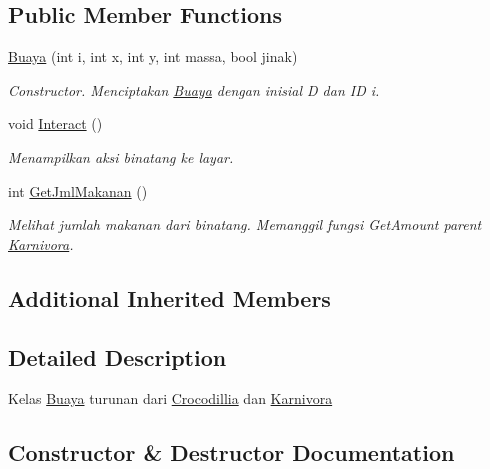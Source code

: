 \subsection*{Public Member Functions}
\begin{DoxyCompactItemize}
\item 
\hyperlink{classBuaya_a56229331076a5f3cb5bf26a354b246d2}{Buaya} (int i, int x, int y, int massa, bool jinak)
\begin{DoxyCompactList}\small\item\em Constructor. Menciptakan \hyperlink{classBuaya}{Buaya} dengan inisial \textquotesingle{}D\textquotesingle{} dan ID i. \end{DoxyCompactList}\item 
void \hyperlink{classBuaya_a3ace61bd8605541c559b5922c2133869}{Interact} ()\hypertarget{classBuaya_a3ace61bd8605541c559b5922c2133869}{}\label{classBuaya_a3ace61bd8605541c559b5922c2133869}

\begin{DoxyCompactList}\small\item\em Menampilkan aksi binatang ke layar. \end{DoxyCompactList}\item 
int \hyperlink{classBuaya_a00f50933adea8ab884443d344f388bfb}{Get\+Jml\+Makanan} ()
\begin{DoxyCompactList}\small\item\em Melihat jumlah makanan dari binatang. Memanggil fungsi Get\+Amount parent \hyperlink{classKarnivora}{Karnivora}. \end{DoxyCompactList}\end{DoxyCompactItemize}
\subsection*{Additional Inherited Members}


\subsection{Detailed Description}
Kelas \hyperlink{classBuaya}{Buaya} turunan dari \hyperlink{classCrocodillia}{Crocodillia} dan \hyperlink{classKarnivora}{Karnivora} 

\subsection{Constructor \& Destructor Documentation}

